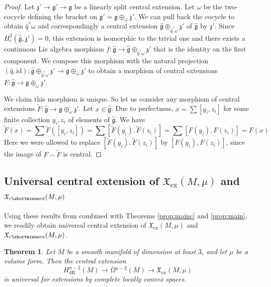 \documentclass{article}
\newcommand{\ex}{\mathrm{ex}}
\newcommand{\dR}{\mathrm{dR}}
\newcommand{\fX}{\mathfrak{X}}
\newcommand{\oline}{\overline}
\newcommand{\ceX}{\fX_{\mathrm{c}\shortminus\mathrm{ex}}}
\newtheorem{Theorem}{Theorem}[section]
\theoremstyle{definition}
\begin{document}
\begin{proof} Let $\mathfrak z'\to \mathfrak g'\to \mathfrak g$ be a linearly split central extension. Let $\omega$ be the two-cocycle defining the bracket on $\mathfrak g'=\mathfrak g\oplus_{\omega} \mathfrak z'$. We can pull back the cocycle to obtain $\hat q^*\omega$ and correspondingly a central extension $\hat{\mathfrak g}\oplus_{\hat q^*\omega}\mathfrak z'$ of $\hat{\mathfrak g}$ by $\mathfrak z'$. Since $H^2_c(\hat{\mathfrak g},\mathfrak z')=0$, this extension is isomorphic to the trivial one and there exists a continuous Lie algebra morphism $f:\hat{\mathfrak g}\to \hat{\mathfrak g}\oplus_{\hat q^*\omega}\mathfrak z'$ that is the identity on the first component. We compose this morphism with the natural projection $(\hat q, \mathrm{id}):\hat{\mathfrak g}\oplus_{\hat q^*\omega}\mathfrak z'\to {\mathfrak g}\oplus_{\omega}\mathfrak z'$ to obtain a morphism of central extensions $F:\hat{\mathfrak{g}} \to {\mathfrak g}\oplus_{\omega}\mathfrak z'$. 
	
We claim this morphism is unique. So let us consider any morphism of central extensions $\tilde F:\hat{\mathfrak{g}} \to {\mathfrak g}\oplus_{\omega}\mathfrak z'$. Let $x\in\hat {\mathfrak g}$. Due to perfectness, $x=\sum[ y_i,z_i]$ for some finite collection $y_i,z_i$ of elements of $\hat{\mathfrak{g}}$. We have
$$
\tilde F(x)=\sum \tilde F([y_i,z_i])= \sum [\tilde F(y_i),\tilde F(z_i)]=\sum [F(y_i),F(z_i)]=F(x)
$$
Here we were allowed to replace $[\tilde F(y_i),\tilde F(z_i)]$ by $[F(y_i), F(z_i)]$, since the image of $F - \tilde{F}$ is central.
\end{proof}
\subsection{\texorpdfstring{Universal central extension of $\fX_{\ex}(M,\mu)$ and $\ceX(M,\mu)$}{Universal central extensions}}
Using these results from \cite{Neeb2002} combined with Theorems \ref{prop:mainc} and \ref{prop:main},
we readily obtain universal central extension of $\fX_{\ex}(M,\mu)$ and $\ceX(M,\mu)$.

\begin{Theorem}\label{Thm:UniversalNoncompactLA} Let $M$ be a smooth manifold of dimension at least $3$, and let $\mu$ be a volume form. Then the central extension 
	$$
	H^{n-2}_{\dR}(M)\to \oline{\Omega}{}^{n-2}(M)\to \mathfrak X_{\ex}(M,\mu)
	$$
	is 
	universal for extensions by complete locally convex spaces.
\end{Theorem}
\end{document}
